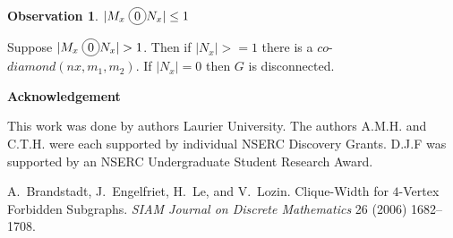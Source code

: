 \documentclass[12pt]{article}
\newcommand*\circled[1]{\tikz[baseline=(char.base)]{
            \node[shape=circle,draw,inner sep=2pt] (char) {#1};}}
\newtheorem{Observation}[Theorem]{Observation}
\begin{document}
\begin{Observation}\label{obs:mx-disjoin}
$|M_x \;\circled{0} N_x| \leq 1$
\end{Observation}
 Suppose $|M_x \;\circled{0} N_x| > 1$. Then if $|N_x| >= 1$ there is a $co$-$diamond (nx, m_1, m_2)$. If $|N_x| = 0$ then $G$ is disconnected.



\begin{center}
{\bf Acknowledgement}
\end{center}
This work was done by authors  Laurier University. The authors A.M.H. and C.T.H. were each supported by individual NSERC Discovery Grants. D.J.F was supported by an NSERC Undergraduate Student Research Award.


\clearpage
\begin{thebibliography}{99}


    A.~Brandstadt, J.~Engelfriet, H.~Le, and V.~Lozin. Clique-Width for $4$-Vertex Forbidden Subgraphs.  {\sl SIAM
     Journal on Discrete Mathematics} 26 (2006) 1682--1708.

\end{thebibliography}
\end{document}
